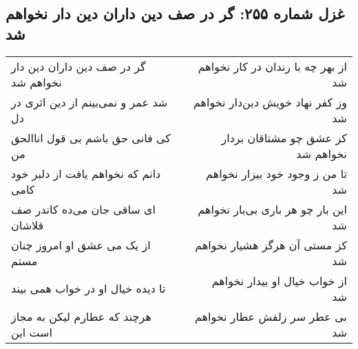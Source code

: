 \begin{center}
\section*{غزل شماره ۲۵۵: گر در صف دین داران دین دار نخواهم شد}
\label{sec:255}
\begin{longtable}{l p{0.5cm} r}
گر در صف دین داران دین دار نخواهم شد
&&
از بهر چه با رندان در کار نخواهم شد
\\
شد عمر و نمی‌بینم از دین اثری در دل
&&
وز کفر نهاد خویش دین‌دار نخواهم شد
\\
کی فانی حق باشم بی قول اناالحق من
&&
کز عشق چو مشتاقان بردار نخواهم شد
\\
دانم که نخواهم یافت از دلبر خود کامی
&&
تا من ز وجود خود بیزار نخواهم شد
\\
ای ساقی جان می‌ده کاندر صف قلاشان
&&
این بار چو هر باری بی‌بار نخواهم شد
\\
از یک می عشق او امروز چنان مستم
&&
کز مستی آن هرگز هشیار نخواهم شد
\\
تا دیده خیال او در خواب همی بیند
&&
از خواب خیال او بیدار نخواهم شد
\\
هرچند که عطارم لیکن به مجاز است این
&&
بی عطر سر زلفش عطار نخواهم شد
\\
\end{longtable}
\end{center}
